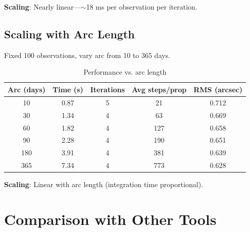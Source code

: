 \begin{table}[h]
\centering
\caption{Performance vs. observation count}
\end{table}

\textbf{Scaling}: Nearly linear—$\sim$18 ms per observation per iteration.

\subsection{Scaling with Arc Length}

Fixed 100 observations, vary arc from 10 to 365 days.

\begin{table}[h]
\centering
\caption{Performance vs. arc length}
\begin{tabular}{ccccc}
\hline
\textbf{Arc (days)} & \textbf{Time (s)} & \textbf{Iterations} & \textbf{Avg steps/prop} & \textbf{RMS (arcsec)} \\
\hline
10 & 0.87 & 5 & 21 & 0.712 \\
30 & 1.34 & 4 & 63 & 0.669 \\
60 & 1.82 & 4 & 127 & 0.658 \\
90 & 2.28 & 4 & 190 & 0.651 \\
180 & 3.91 & 4 & 381 & 0.639 \\
365 & 7.34 & 4 & 773 & 0.628 \\
\hline
\end{tabular}
\end{table}

\textbf{Scaling}: Linear with arc length (integration time proportional).

\section{Comparison with Other Tools}

